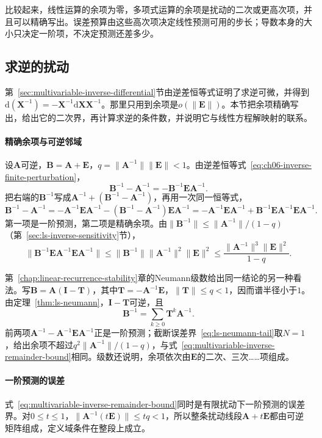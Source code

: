 比较起来，线性运算的余项为零，多项式运算的余项是扰动的二次或更高次项，并且可以精确写出。误差预算由这些高次项决定线性预测可用的步长；导数本身的大小只决定一阶项，不决定预测还差多少。

\subsection{求逆的扰动}
\label{sec:multivariable-inverse-perturbation}

第~\ref{sec:multivariable-inverse-differential}节由逆差恒等式证明了求逆可微，并得到$\mathrm d(\bm X^{-1})=-\bm X^{-1}\mathrm d\bm X\bm X^{-1}$。那里只用到余项是$o(\lVert\bm E\rVert)$。本节把余项精确写出，给出它的二次界，再计算求逆的条件数，并说明它与线性方程解映射的联系。

\paragraph{精确余项与可逆邻域}
设$\bm A$可逆，$\bm B=\bm A+\bm E$，$q=\lVert\bm A^{-1}\rVert\lVert\bm E\rVert<1$。由逆差恒等式~\eqref{eq:ch06-inverse-finite-perturbation}，
\[
 \bm B^{-1}-\bm A^{-1}=-\bm B^{-1}\bm E\bm A^{-1}.
\]
把右端的$\bm B^{-1}$写成$\bm A^{-1}+(\bm B^{-1}-\bm A^{-1})$，再用一次同一恒等式，
\[
 \bm B^{-1}-\bm A^{-1}
 =-\bm A^{-1}\bm E\bm A^{-1}-(\bm B^{-1}-\bm A^{-1})\bm E\bm A^{-1}
 =-\bm A^{-1}\bm E\bm A^{-1}+\bm B^{-1}\bm E\bm A^{-1}\bm E\bm A^{-1}.
\]
第一项是一阶预测，第二项是精确余项。由$\lVert\bm B^{-1}\rVert\leq\lVert\bm A^{-1}\rVert/(1-q)$（第~\ref{sec:ls-inverse-sensitivity}节），
\begin{equation}
 \lVert\bm B^{-1}\bm E\bm A^{-1}\bm E\bm A^{-1}\rVert
 \leq\lVert\bm B^{-1}\rVert\lVert\bm A^{-1}\rVert^2\lVert\bm E\rVert^2
 \leq\frac{\lVert\bm A^{-1}\rVert^3\lVert\bm E\rVert^2}{1-q}.
\label{eq:multivariable-inverse-remainder-bound}
\end{equation}

第~\ref{chap:linear-recurrence-stability}章的Neumann级数给出同一结论的另一种看法。写$\bm B=\bm A(\bm I-\bm T)$，其中$\bm T=-\bm A^{-1}\bm E$，$\lVert\bm T\rVert\leq q<1$，因而谱半径小于$1$。由定理~\ref{thm:ls-neumann}，$\bm I-\bm T$可逆，且
\[
 \bm B^{-1}=\sum_{k\geq0}\bm T^k\bm A^{-1}.
\]
前两项$\bm A^{-1}-\bm A^{-1}\bm E\bm A^{-1}$正是一阶预测；截断误差界~\eqref{eq:ls-neumann-tail}取$N=1$，给出余项不超过$q^2\lVert\bm A^{-1}\rVert/(1-q)$，与式~\eqref{eq:multivariable-inverse-remainder-bound}相同。级数还说明，余项依次由$\bm E$的二次、三次……项组成。

\paragraph{一阶预测的误差}
式~\eqref{eq:multivariable-inverse-remainder-bound}同时是有限扰动下一阶预测的误差界。对$0\leq t\leq1$，$\lVert\bm A^{-1}(t\bm E)\rVert\leq tq<1$，所以整条扰动线段$\bm A+t\bm E$都由可逆矩阵组成，定义域条件在整段上成立。

